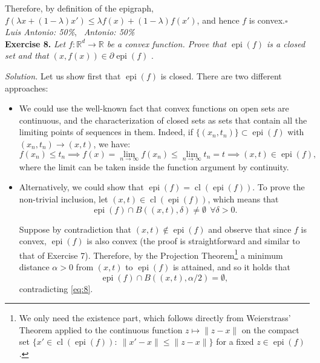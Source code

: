\documentclass[12pt]{article}
\newcommand*{\QED}{\null\nobreak\hfill\ensuremath{\square}}%
\begin{document}
Therefore, by definition of the epigraph, \( f(\lambda x + (1-\lambda)x') \leq \lambda f(x) + (1-\lambda)f(x')\), and hence $f$ is convex.\QED\\

\textit{Luis Antonio: 50\%}, \ \textit{Antonio: 50\%}\\
\textbf{Exercise 8.} \emph{Let \( f : \mathbb{R}^d \to \mathbb{R} \) be a convex function. Prove that \( \operatorname{epi}(f) \) is a closed set and that \( (x, f(x)) \in \partial \operatorname{epi}(f) \)  }.

\emph{Solution.} Let us show first that \( \operatorname{epi}(f)  \) is closed. There are two different approaches:

\begin{itemize}
  \item We could use the well-known fact that convex functions on open sets are continuous, and the characterization of closed sets as sets that contain all the limiting points of sequences in them. Indeed, if $\{(x_n, t_n)\}\subset \operatorname{epi}(f)$ with $(x_n, t_n)\to (x, t)$, we have:
  \[
  f(x_n) \leq t_n \implies f(x)=\lim_{n\to\infty} f(x_n) \leq \lim_{n\to\infty} t_n = t \implies (x, t) \in \operatorname{epi}(f),
  \]
  where the limit can be taken inside the function argument by continuity.
\item Alternatively, we could show that \( \operatorname{epi}(f)  = \operatorname{cl}(\operatorname{epi}(f) ) \). To prove the non-trivial inclusion, let \( (x,t) \in \operatorname{cl}(\operatorname{epi}(f) ) \), which means that
\begin{equation}
  \label{eq:8}
\operatorname{epi}(f) \cap B((x,t), \delta) \neq \emptyset \ \ \forall \delta > 0.
\end{equation}

Suppose by contradiction that $(x, t) \notin \operatorname{epi}(f)$ and observe that since $f$ is convex, $\operatorname{epi}(f)$ is also convex (the proof is straightforward and similar to that of Exercise 7). Therefore, by the Projection Theorem\footnote{We only need the existence part, which follows directly from Weierstrass' Theorem applied to the continuous function $z\mapsto \lVert z - x \rVert$ on the compact set $\{x' \in \operatorname{cl}(\operatorname{epi}(f)): \ \lVert x' - x \rVert \leq \lVert z - x \rVert\}$ for a fixed $z\in \operatorname{epi}(f)$.} a minimum distance $\alpha > 0$ from $(x, t)$ to $\operatorname{epi}(f)$ is attained, and so it holds that
\[
\operatorname{epi}(f) \cap B((x, t), \alpha/2) = \emptyset,
\]
contradicting \eqref{eq:8}.
\end{itemize}
\end{document}
